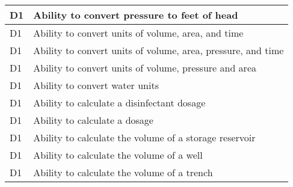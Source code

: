 \begin{table}[H]
\begin{tabular}{| m{1cm} | m{15cm} |}
D1 & Ability to convert   pressure to feet of head                                \\ \hline
D1 & Ability to convert   units of volume, area, and time                         \\ \hline
D1 & Ability to convert   units of volume, area, pressure, and time               \\ \hline
D1 & Ability to convert   units of volume, pressure and area                      \\ \hline
D1 & Ability to convert   water units                                             \\ \hline
D1 & Ability to calculate   a disinfectant dosage                                 \\ \hline
D1 & Ability to calculate   a dosage                                              \\ \hline
D1 & Ability to calculate   the volume of a storage reservoir                     \\ \hline
D1 & Ability to calculate   the volume of a well                                  \\ \hline
D1 & Ability to calculate   the volume of a trench                                \\ \hline

\end{tabular}
\end{table}

\newpage



